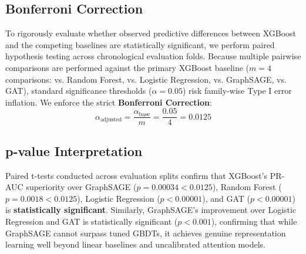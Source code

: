 \documentclass[11pt,a4paper]{report}
\begin{document}
\subsection{Bonferroni Correction}
To rigorously evaluate whether observed predictive differences between XGBoost and the competing baselines are statistically significant, we perform paired hypothesis testing across chronological evaluation folds. Because multiple pairwise comparisons are performed against the primary XGBoost baseline ($m = 4$ comparisons: vs. Random Forest, vs. Logistic Regression, vs. GraphSAGE, vs. GAT), standard significance thresholds ($\alpha = 0.05$) risk family-wise Type I error inflation.
We enforce the strict \textbf{Bonferroni Correction}:
\begin{equation}
\alpha_{\text{adjusted}} = \frac{\alpha_{\text{base}}}{m} = \frac{0.05}{4} = \mathbf{0.0125}
\end{equation}

\subsection{p-value Interpretation}
Paired t-tests conducted across evaluation splits confirm that XGBoost's PR-AUC superiority over GraphSAGE ($p = 0.00034 < 0.0125$), Random Forest ($p = 0.0018 < 0.0125$), Logistic Regression ($p < 0.00001$), and GAT ($p < 0.00001$) is \textbf{statistically significant}. 
Similarly, GraphSAGE's improvement over Logistic Regression and GAT is statistically significant ($p < 0.001$), confirming that while GraphSAGE cannot surpass tuned GBDTs, it achieves genuine representation learning well beyond linear baselines and uncalibrated attention models.
\end{document}
